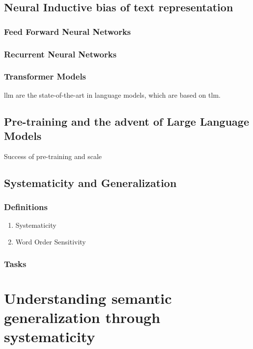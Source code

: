 \documentclass[letterpaper, 12pt]{report}
\begin{document}
\section{Neural Inductive bias of text representation}
\label{sec:org2479903}
\subsection{Feed Forward Neural Networks}
\label{sec:orgc5c64b1}
\subsection{Recurrent Neural Networks}
\label{sec:org081fc19}
\subsection{Transformer Models}
\label{sec:orgce0ee81}

\gls{llm} are the state-of-the-art in language models, which are based on \gls{tlm}.
\section{Pre-training and the advent of Large Language Models}
\label{sec:org754bcf3}
Success of pre-training and scale
\section{Systematicity and Generalization}
\label{sec:orgb799e4e}
\subsection{Definitions}
\label{sec:org70d8bf6}
\begin{enumerate}
\item Systematicity
\label{sec:orgbb21691}
\item Word Order Sensitivity
\label{sec:org41a33eb}
\end{enumerate}
\subsection{Tasks}
\label{sec:org51f5f2f}


\clearpage

\chapter{Understanding semantic generalization through systematicity}
\label{chap:clutrr}
\end{document}
